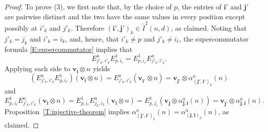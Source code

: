 \documentclass[10pt,a4paper]{amsart}
\newcommand{\Itwo}{\tilde{I}^{2}(n,d)}
\newcommand{\bi}{\mathbf{i}}
\newcommand{\bj}{\mathbf{j}}
\newcommand{\bv}{\mathbf{v}}
\begin{document}
\begin{proof}
To prove (3), we first note that, by the choice of $p$, the entries of $\bi'$ and $\bj'$ are pairwise distinct and the two have the same values in every position except possibly at $i'_{k}$ and $j'_{k}$.  Therefore $(\bi', \bj')_{k} \in \Itwo$, as claimed.  Noting that $j'_{k}=j_{k}$ and $i'_{k}=i_{k}$, and, hence, that $i'_{k}\neq p$ and $j'_{k}\neq i_{\ell}$, the supercommutator formula \eqref{E:supercommutator} implies that 
\[
E^{a}_{j'_{k},i'_{k}}E_{p,i_{\ell}}^{1} =E_{p,i_{\ell}}^{1}E^{a}_{j'_{k},i'_{k}}.
\] Applying each side to $ \bv_{\bi}^{} \otimes n$ yields
\[
\left(E^{a}_{j'_{k},i'_{k}}E_{p,i_{\ell}}^{1} \right)( \bv_{\bi}^{} \otimes n) = E^{a}_{j'_{k},i'_{k}}( \bv_{\bi'}^{} \otimes n)= \bv_{\bj'}^{} \otimes \alpha_{(\bj', \bi')_{k}}^{a}(n) 
\] and 
\[
E_{p,i_{\ell}}^{1}E^{a}_{j'_{k},i'_{k}}( \bv_{\bi}^{} \otimes n) = E_{p,i_{\ell}}^{1}E^{a}_{j_{k},i_{k}}( \bv_{\bi}^{} \otimes n)=E_{p,j_{\ell}}^{1}\left( \bv_{\bj}^{} \otimes \alpha_{\bj, \bi}^{a} (n) \right) =  \bv_{\bj'}^{} \otimes \alpha_{\bj, \bi}^{a} (n).
\]  Proposition~\ref{T:injective-theorem} implies $\alpha_{(\bj' , \bi')_{k}}^{a} (n) = \alpha_{(\bj, \bi)_{k}}^{a}(n)$, as claimed.
\end{proof}
\end{document}
